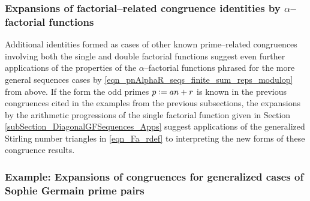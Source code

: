 \documentclass[12pt,reqno]{article}
\numberwithin{sfootnote}{section}
\numberwithin{equation}{section}
\theoremstyle{plain}
\theoremstyle{definition}
\theoremstyle{remark}
\newcommand{\defequals}{\ensuremath{\vcentcolon=}}
\begin{document}
\subsubsection{Expansions of factorial--related congruence identities by 
               $\alpha$--factorial functions} 

Additional identities formed as cases of other known 
prime--related congruences involving both the 
single and double factorial functions suggest even further 
applications of the properties of the $\alpha$--factorial 
functions phrased for the more general sequences cases by 
\eqref{eqn_pnAlphaR_seqs_finite_sum_reps_modulop} from above. 
If the form the odd primes $p \defequals an+r$ is known 
in the previous congruences cited in the examples from the previous 
subsections, the 
expansions by the arithmetic progressions of the 
single factorial function given in 
Section \ref{subSection_DiagonalGFSequences_Apps} 
suggest applications of the generalized Stirling number triangles 
in \eqref{eqn_Fa_rdef} to interpreting the new forms of these 
congruence results. 

\subsubsection{Example: Expansions of congruences for 
               generalized cases of Sophie Germain prime pairs} 
\end{document}
